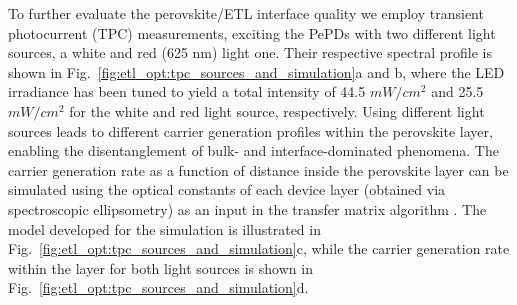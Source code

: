 To further evaluate the perovskite/ETL interface quality we employ transient photocurrent (TPC) measurements, exciting the PePDs with two different light sources, a white and red (625 nm) light one. Their respective spectral profile is shown in Fig.~\ref{fig:etl_opt:tpc_sources_and_simulation}a and b, where the LED irradiance has been tuned to yield a total intensity of 44.5 $mW/cm^2$ and 25.5 $mW/cm^2$ for the white and red light source, respectively. Using different light sources leads to different carrier generation profiles within the perovskite layer, enabling the disentanglement of bulk- and interface-dominated phenomena. The carrier generation rate as a function of distance inside the perovskite layer can be simulated using the optical constants of each device layer (obtained via spectroscopic ellipsometry) as an input in the transfer matrix algorithm \cite{Burkhard2010AccountingCells}. The model developed for the simulation is illustrated in Fig.~\ref{fig:etl_opt:tpc_sources_and_simulation}c, while  the carrier generation rate within the  layer for both light sources is shown in Fig.~\ref{fig:etl_opt:tpc_sources_and_simulation}d. 


